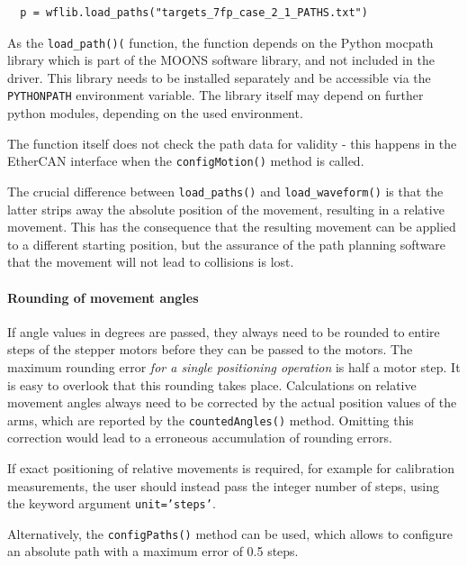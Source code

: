 \documentclass[fontsize=12,a4paper]{scrreprt}
\begin{document}
\begin{verbatim}
  p = wflib.load_paths("targets_7fp_case_2_1_PATHS.txt")
\end{verbatim}

As the \texttt{load\_path()(} function, the function depends on the
Python mocpath library which is part of the MOONS software library,
and not included in the driver.  This library needs to be installed
separately and be accessible via the \texttt{PYTHONPATH} environment
variable. The library itself may depend on further python modules,
depending on the used environment.

The function itself does not check the path data for validity - this
happens in the EtherCAN interface when the \texttt{configMotion()} method is
called.

The crucial difference between \texttt{load\_paths()} and
\texttt{load\_waveform()} is that the latter strips away the absolute
position of the movement, resulting in a relative movement.  This has
the consequence that the resulting movement can be applied to a
different starting position, but the assurance of the path planning
software that the movement will not lead to collisions is lost.


\paragraph{Rounding of movement angles}
%
%
If angle values in degrees are passed, they always need to be rounded
to entire steps of the stepper motors before they can be passed to the
motors.  The maximum rounding error \emph{for a single positioning
  operation} is half a motor step.  It is easy to overlook that this
rounding takes place.  Calculations on relative movement angles always
need to be corrected by the actual position values of the arms, which
are reported by the \texttt{countedAngles()} method. Omitting this
correction would lead to a erroneous accumulation of rounding errors.

If exact positioning of relative movements is required, for example
for calibration measurements, the user should instead pass the integer
number of steps, using the keyword argument \texttt{unit='steps'}.

Alternatively, the \texttt{configPaths()} method can be used, which
allows to configure an absolute path with a maximum error of 0.5
steps.
\end{document}
